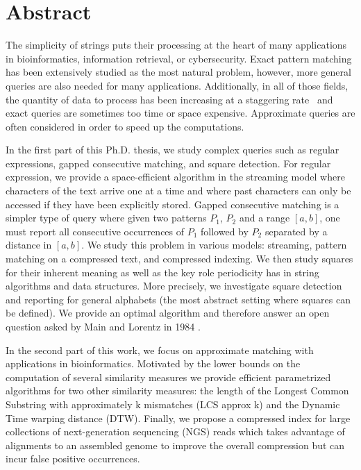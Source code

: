 \chapter*{Abstract}

The simplicity of strings puts their processing at the heart of many applications in bioinformatics, information retrieval, or cybersecurity. Exact pattern matching has been extensively studied \cite{} as the most natural problem, however, more general queries are also needed for many applications\cite{}. Additionally, in all of those fields, the quantity of data to process has been increasing at a staggering rate~\cite{muir2016real} and exact queries are sometimes too time or space expensive. Approximate queries are often considered in order to speed up the computations.

In the first part of this Ph.D. thesis, we study complex queries such as regular expressions, gapped consecutive matching, and square detection. 
For regular expression, we provide a space-efficient algorithm in the streaming model where characters of the text arrive one at a time and where past characters can only be accessed if they have been explicitly stored. 
Gapped consecutive matching is a simpler type of query where given two patterns $P_1$, $P_2$ and a range $[a,b]$, one must report all consecutive occurrences of $P_1$ followed by $P_2$ separated by a distance in $[a,b]$. We study this problem in various models: streaming, pattern matching on a compressed text, and compressed indexing.
We then study squares for their inherent meaning \cite{} as well as the key role periodicity has in string algorithms and data structures. More precisely, we investigate square detection and reporting for general alphabets (the most abstract setting where squares can be defined). We provide an optimal algorithm and therefore answer an open question asked by Main and Lorentz in 1984 \cite{}.

In the second part of this work, we focus on approximate matching with applications in bioinformatics.
Motivated by the lower bounds on the computation of several similarity measures we provide efficient parametrized algorithms for two other similarity measures: the length of the Longest Common Substring with approximately k mismatches (LCS approx k) and the Dynamic Time warping distance (DTW).
Finally, we propose a compressed index for large collections of next-generation sequencing (NGS) reads which takes advantage of alignments to an assembled genome to improve the overall compression but can incur false positive occurrences.


